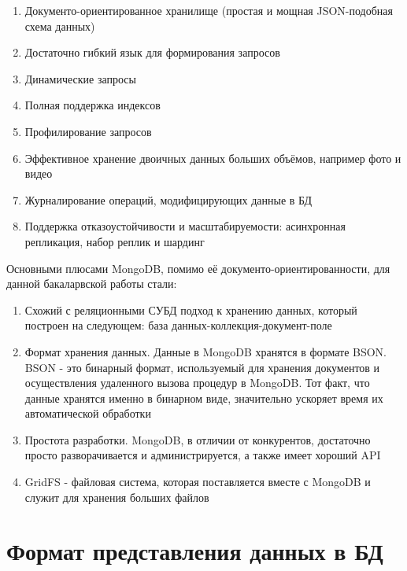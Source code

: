 \documentclass[14pt]{extreport}
\begin{document}
\begin{enumerate}

\item Документо-ориентированное хранилище (простая и мощная JSON-подобная схема данных)
\item Достаточно гибкий язык для формирования запросов
\item Динамические запросы
\item Полная поддержка индексов
\item Профилирование запросов
\item Эффективное хранение двоичных данных больших объёмов, например фото и видео
\item Журналирование операций, модифицирующих данные в БД
\item Поддержка отказоустойчивости и масштабируемости: асинхронная репликация, набор реплик и шардинг

\end{enumerate}

Основными плюсами MongoDB, помимо её документо-ориентированности, для данной бакаларвской работы стали:

\begin{enumerate}

\item Схожий с реляционными СУБД подход к хранению данных, который построен на следующем: база данных-коллекция-документ-поле

\item Формат хранения данных. Данные в MongoDB хранятся в формате BSON. BSON - это бинарный формат, используемый для хранения документов и осуществления удаленного вызова процедур в MongoDB. Тот факт, что данные хранятся именно в бинарном виде, значительно ускоряет время их автоматической обработки

\item Простота разработки. MongoDB, в отличии от конкурентов, достаточно просто разворачивается и администрируется, а также имеет хороший API 

\item GridFS - файловая система, которая поставляется вместе с MongoDB и служит для хранения больших файлов

\end{enumerate}


\section{Формат представления данных в БД}
\end{document}

